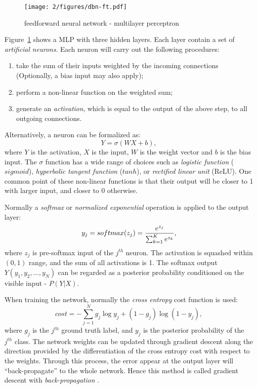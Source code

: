 \begin{figure}[htb]
\centering
\texttt{[image: 2/figures/dbn-ft.pdf]}
\caption{feedforward neural network - multilayer perceptron}
\label{fig:2-dbn-ft}
\end{figure}
Figure~\ref{fig:2-dbn-ft} shows a MLP with three hidden layers. Each layer contain a set of {\it artificial neurons}. Each neuron will carry out the following procedures:
\begin{enumerate}
\item take the sum of their inputs weighted by the incoming connections (Optionally, a bias input may also apply);
\item perform a non-linear function on the weighted sum;
\item generate an {\it activation}, which is equal to the output of the above step, to all outgoing connections.
\end{enumerate}
Alternatively, a neuron can be formalized as:
\begin{equation}
Y = \sigma(WX+b),
\end{equation}
where $Y$ is the activation, $X$ is the input, $W$ is the weight vector and $b$ is the bias input. The $\sigma$ function has a wide range of choices \cite{sigtia2014improved} such as {\it logistic function} ($sigmoid$), {\it hyperbolic tangent function} ($tanh$), or {\it rectified linear unit} (ReLU). One common point of these non-linear functions is that their output will be closer to 1 with larger input, and closer to 0 otherwise.

Normally a {\it softmax} or {\it normalized exponential} operation is applied to the output layer:
\begin{equation}
y_j = softmax(z_j)={e^{z_j} \over \sum_{k=1}^K e^{z_k}},
\end{equation}
where $z_j$ is pre-softmax input of the $j^{th}$ neuron. The activation is squashed within $(0,1)$ range, and the sum of all activations is 1. The softmax output $Y(y_1,y_2,...,y_N)$ can be regarded as a posterior probability conditioned on the visible input - $P(Y|X)$.

When training the network, normally the {\it cross entropy} cost function \cite{murphy2012machine} is used:
\begin{equation}\label{eq:2-crossentropy}
cost = -\sum_{j=1}^N g_j\log y_j + (1-g_j)\log(1-y_j),
\end{equation}
where $g_j$ is the $j^{th}$ ground truth label, and $y_j$ is the posterior probability of the $j^{th}$ class. The network weights can be updated through gradient descent along the direction provided by the differentiation of the cross entropy cost with respect to the weights. Through this process, the error appear at the output layer will ``back-propagate'' to the whole network. Hence this method is called gradient descent with {\it back-propagation} \cite{rumelhart1988learning}.

